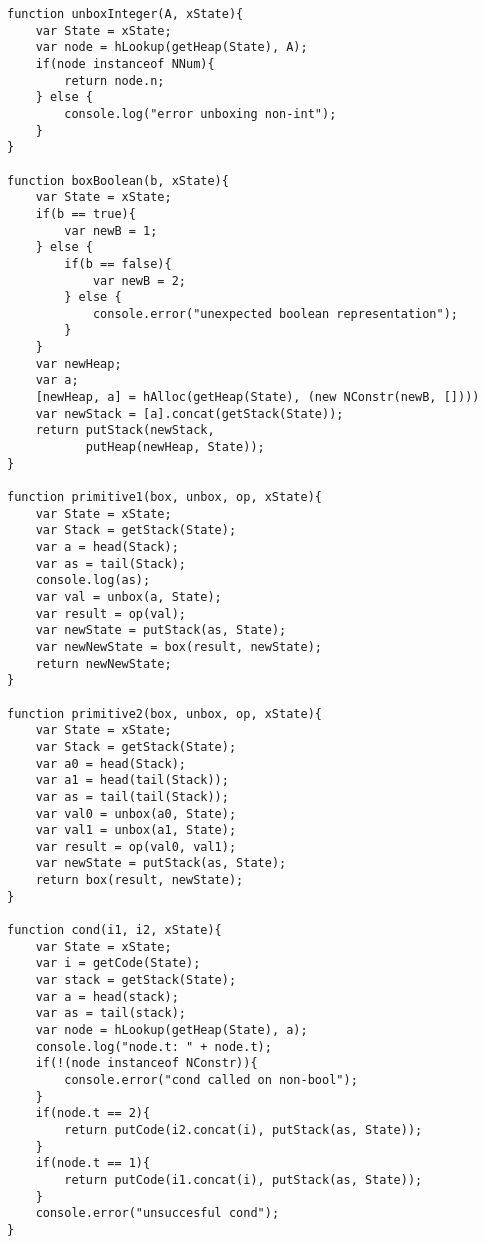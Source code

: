 \begin{verbatim}
function unboxInteger(A, xState){
    var State = xState;
    var node = hLookup(getHeap(State), A);
    if(node instanceof NNum){
        return node.n;
    } else {
        console.log("error unboxing non-int");
    }
}

function boxBoolean(b, xState){
    var State = xState;
    if(b == true){
        var newB = 1;
    } else {
        if(b == false){
            var newB = 2;
        } else {
            console.error("unexpected boolean representation");
        }
    }
    var newHeap;
    var a;
    [newHeap, a] = hAlloc(getHeap(State), (new NConstr(newB, [])))
    var newStack = [a].concat(getStack(State));
    return putStack(newStack, 
           putHeap(newHeap, State));
}

function primitive1(box, unbox, op, xState){
    var State = xState;
    var Stack = getStack(State);
    var a = head(Stack);
    var as = tail(Stack);
    console.log(as);
    var val = unbox(a, State);
    var result = op(val);
    var newState = putStack(as, State);
    var newNewState = box(result, newState);
    return newNewState;
}

function primitive2(box, unbox, op, xState){
    var State = xState;
    var Stack = getStack(State);
    var a0 = head(Stack);
    var a1 = head(tail(Stack));
    var as = tail(tail(Stack));
    var val0 = unbox(a0, State);
    var val1 = unbox(a1, State);
    var result = op(val0, val1);
    var newState = putStack(as, State);
    return box(result, newState);
}

function cond(i1, i2, xState){
    var State = xState;
    var i = getCode(State);
    var stack = getStack(State);
    var a = head(stack);
    var as = tail(stack);
    var node = hLookup(getHeap(State), a);
    console.log("node.t: " + node.t);
    if(!(node instanceof NConstr)){
        console.error("cond called on non-bool");
    }
    if(node.t == 2){
        return putCode(i2.concat(i), putStack(as, State));
    }
    if(node.t == 1){
        return putCode(i1.concat(i), putStack(as, State));
    }
    console.error("unsuccesful cond");
}
\end{verbatim}
